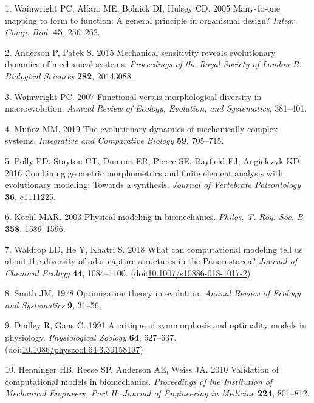 \documentclass[
]{article}
\newenvironment{cslreferences}%
  {}%
  {\par}
\begin{document}
\hypertarget{refs}{}
\begin{cslreferences}
\leavevmode\hypertarget{ref-Wainwright:2005}{}%
1. Wainwright PC, Alfaro ME, Bolnick DI, Hulsey CD. 2005 Many-to-one
mapping to form to function: A general principle in organismal design?
\emph{Integr. Comp. Biol.} \textbf{45}, 256--262.

\leavevmode\hypertarget{ref-Anderson:2015}{}%
2. Anderson P, Patek S. 2015 Mechanical sensitivity reveals evolutionary
dynamics of mechanical systems. \emph{Proceedings of the Royal Society
of London B: Biological Sciences} \textbf{282}, 20143088.

\leavevmode\hypertarget{ref-Wainwright:2007}{}%
3. Wainwright PC. 2007 Functional versus morphological diversity in
macroevolution. \emph{Annual Review of Ecology, Evolution, and
Systematics}, 381--401.

\leavevmode\hypertarget{ref-Munoz:2019}{}%
4. Muñoz MM. 2019 The evolutionary dynamics of mechanically complex
systems. \emph{Integrative and Comparative Biology} \textbf{59},
705--715.

\leavevmode\hypertarget{ref-Polly:2016}{}%
5. Polly PD, Stayton CT, Dumont ER, Pierce SE, Rayfield EJ, Angielczyk
KD. 2016 Combining geometric morphometrics and finite element analysis
with evolutionary modeling: Towards a synthesis. \emph{Journal of
Vertebrate Paleontology} \textbf{36}, e1111225.

\leavevmode\hypertarget{ref-Koehl:2003}{}%
6. Koehl MAR. 2003 Physical modeling in biomechanics. \emph{Philos. T.
Roy. Soc. B} \textbf{358}, 1589--1596.

\leavevmode\hypertarget{ref-Waldrop:entmodel}{}%
7. Waldrop LD, He Y, Khatri S. 2018 What can computational modeling tell
us about the diversity of odor-capture structures in the Pancrustacea?
\emph{Journal of Chemical Ecology} \textbf{44}, 1084--1100.
(doi:\href{https://doi.org/10.1007/s10886-018-1017-2}{10.1007/s10886-018-1017-2})

\leavevmode\hypertarget{ref-Smith:1978}{}%
8. Smith JM. 1978 Optimization theory in evolution. \emph{Annual Review
of Ecology and Systematics} \textbf{9}, 31--56.

\leavevmode\hypertarget{ref-Dudley:1991}{}%
9. Dudley R, Gans C. 1991 A critique of symmorphosis and optimality
models in physiology. \emph{Physiological Zoology} \textbf{64},
627--637.
(doi:\href{https://doi.org/10.1086/physzool.64.3.30158197}{10.1086/physzool.64.3.30158197})

\leavevmode\hypertarget{ref-Henninger:2010}{}%
10. Henninger HB, Reese SP, Anderson AE, Weiss JA. 2010 Validation of
computational models in biomechanics. \emph{Proceedings of the
Institution of Mechanical Engineers, Part H: Journal of Engineering in
Medicine} \textbf{224}, 801--812.


\end{cslreferences}
\end{document}
